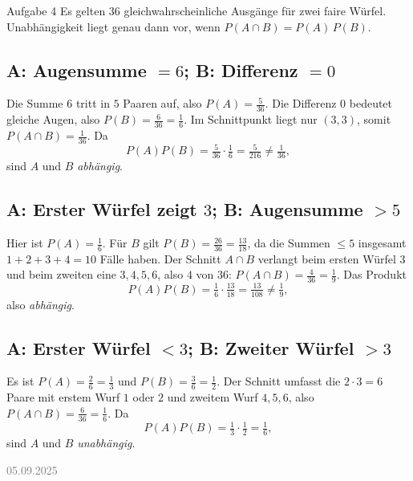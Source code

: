\documentclass[11pt,a4paper,oneside]{article}
\newcommand{\lessondate}[1]{
	\noindent\hfill\textcolor{gray}{\textsc{#1}} \\
	\vspace{0.5cm}
}
\begin{document}
	\begin{loesung}{Aufgabe 4}
		Es gelten $36$ gleichwahrscheinliche Ausgänge für zwei faire Würfel. Unabhängigkeit liegt genau dann vor, wenn $P(A\cap B)=P(A)\,P(B)$.
		
		\subsection*{A: Augensumme $=6$; B: Differenz $=0$}
		Die Summe $6$ tritt in $5$ Paaren auf, also $P(A)=\tfrac{5}{36}$. Die Differenz $0$ bedeutet gleiche Augen, also $P(B)=\tfrac{6}{36}=\tfrac{1}{6}$. Im Schnittpunkt liegt nur $(3,3)$, somit $P(A\cap B)=\tfrac{1}{36}$. Da 
		\[
		P(A)P(B)=\tfrac{5}{36}\cdot\tfrac{1}{6}=\tfrac{5}{216}\neq \tfrac{1}{36},
		\]
		sind $A$ und $B$ \emph{abhängig}.
		
		\subsection*{A: Erster Würfel zeigt $3$; B: Augensumme $>5$}
		Hier ist $P(A)=\tfrac{1}{6}$. Für $B$ gilt $P(B)=\tfrac{26}{36}=\tfrac{13}{18}$, da die Summen $\le 5$ insgesamt $1+2+3+4=10$ Fälle haben. Der Schnitt $A\cap B$ verlangt beim ersten Würfel $3$ und beim zweiten eine $3,4,5,6$, also $4$ von $36$: $P(A\cap B)=\tfrac{4}{36}=\tfrac{1}{9}$. Das Produkt
		\[
		P(A)P(B)=\tfrac{1}{6}\cdot \tfrac{13}{18}=\tfrac{13}{108}\neq \tfrac{1}{9},
		\]
		also \emph{abhängig}.
		
		\subsection*{A: Erster Würfel $<3$; B: Zweiter Würfel $>3$}
		Es ist $P(A)=\tfrac{2}{6}=\tfrac{1}{3}$ und $P(B)=\tfrac{3}{6}=\tfrac{1}{2}$. Der Schnitt umfasst die $2\cdot 3=6$ Paare mit erstem Wurf $1$ oder $2$ und zweitem Wurf $4,5,6$, also $P(A\cap B)=\tfrac{6}{36}=\tfrac{1}{6}$. Da
		\[
		P(A)P(B)=\tfrac{1}{3}\cdot \tfrac{1}{2}=\tfrac{1}{6},
		\]
		sind $A$ und $B$ \emph{unabhängig}.
	\end{loesung}
	
	\lessondate{05.09.2025}\\	
	
\end{document}
